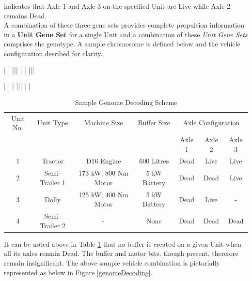 \documentclass[ExampleMasters.tex]{subfiles}
\begin{document}
			indicates that Axle 1 and Axle 3 on the specified Unit are Live while Axle 2 remains Dead.\\

		A combination of these three gene sets provides complete propulsion information in a \textbf{Unit Gene Set} for a single Unit and a combination of these \textit{Unit Gene Sets} comprises the genotype. A sample chromosome is defined below and the vehicle configuration desribed for clarity.\\


			\centerline{\framebox{0} | \framebox{0} | \framebox{1} ||| \framebox{0}\framebox{1} | \framebox{0} |  |||} 
			\centerline{|  | \framebox{0} |  ||| \framebox{0} \framebox{1} | \framebox{0} | }

		\begin{table}[H]
			\caption{Sample Genome Decoding Scheme}
			\centering
			\begin{tabular}{c c c c c c c}
			\hline\hline
			Unit No. & Unit Type & Machine Size & Buffer Size & \multicolumn{3}{c}{Axle Configuration}\\ \cline{5-7}
			& & & & Axle 1 & Axle 2 & Axle 3\\
			\hline
			1 & Tractor & D16 Engine & 600 Litres & Dead & Live & Live \\
			2 & Semi-Trailer 1 & 173 kW, 800 Nm  Motor & 5 kW Battery & Dead & Dead & Live \\
			3 & Dolly & 125 kW, 400 Nm  Motor & 5 kW Battery & Dead & Live & - \\
			4 & Semi-Trailer 2 & - & None & Dead & Dead & Dead \\
			\hline
			\end{tabular}
			\label{table:genomeDecoding}
		\end{table}

		It can be noted above in Table \ref{table:genomeDecoding} that no buffer is created on a given Unit when all its axles remain Dead. The buffer and motor bits, though present, therefore remain insignificant. The above sample vehicle combination is pictorially represented as below in Figure \ref{genomeDecoding}.\\
\end{document}
